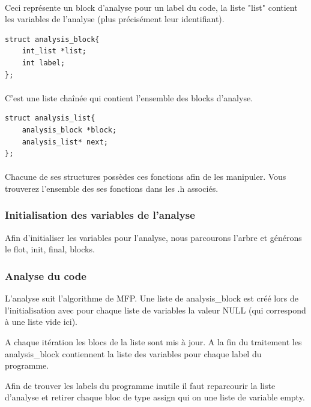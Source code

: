\documentclass[12pt,a4paper,oneside]{article}
\begin{document}
\paragraph{}
Ceci représente un block d'analyse pour un label du code, la liste "list" contient les variables de l'analyse (plus précisément leur identifiant).
\begin{lstlisting}
struct analysis_block{
	int_list *list;
	int label;
};
\end{lstlisting}

\paragraph{}
C'est une liste chaînée qui contient l'ensemble des blocks d'analyse.
\begin{lstlisting}
struct analysis_list{
	analysis_block *block;
	analysis_list* next;
};
\end{lstlisting}

\paragraph{}
Chacune de ses structures possèdes ces fonctions afin de les manipuler. Vous trouverez l'ensemble des ses fonctions dans les .h associés.

\subsubsection{Initialisation des variables de l'analyse}
Afin d'initialiser les variables pour l'analyse, nous parcourons l'arbre et générons le flot, init, final, blocks.

\subsubsection{Analyse du code}
L'analyse suit l'algorithme de MFP. Une liste de analysis\_block est créé lors de l'initialisation avec pour chaque liste de variables la valeur NULL (qui correspond à une liste vide ici).

A chaque itération les blocs de la liste sont mis à jour. A la fin du traitement les analysis\_block contiennent la liste des variables pour chaque label du programme.

Afin de trouver les labels du programme inutile il faut reparcourir la liste d'analyse et retirer chaque bloc de type assign qui on une liste de variable empty.

\newpage
\end{document}
